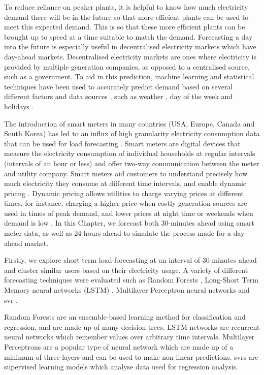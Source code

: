 To reduce reliance on peaker plants, it is helpful to know how much electricity demand there will be in the future so that more efficient plants can be used to meet this expected demand. This is so that these more efficient plants can be brought up to speed at a time suitable to match the demand. Forecasting a day into the future is especially useful in decentralised electricity markets which have day-ahead markets. Decentralised electricity markets are ones where electricity is provided by multiple generation companies, as opposed to a centralised source, such as a government. To aid in this prediction, machine learning and statistical techniques have been used to accurately predict demand based on several different factors and data sources \cite{Kell2018a}, such as weather \cite{Hong2014}, day of the week \cite{Al-Musaylh2018} and holidays \cite{Vrablecova2017}. 


The introduction of smart meters in many countries (USA, Europe, Canada and South Korea) has led to an influx of high granularity electricity consumption data that can be used for load forecasting \cite{Depuru2011a}. Smart meters are digital devices that measure the electricity consumption of individual households at regular intervals (intervals of an hour or less) and offer two-way communication between the meter and utility company. Smart meters aid customers to understand precisely how much electricity they consume at different time intervals, and enable dynamic pricing \cite{Abreu2012a}. Dynamic pricing allows utilities to charge varying prices at different times, for instance, charging a higher price when costly generation sources are used in times of peak demand, and lower prices at night time or weekends when demand is low \cite{Ito2013,Liu2016}. In this Chapter, we forecast both 30-minutes ahead using smart meter data, as well as 24-hours ahead to simulate the process made for a day-ahead market. 



Firstly, we explore short term load-forecasting at an interval of 30 minutes ahead and cluster similar users based on their electricity usage. A variety of different forecasting techniques were evaluated such as Random Forests \cite{ho1995random}, Long-Short Term Memory neural networks (LSTM) \cite{Hochreiter1997}, Multilayer Perceptron neural networks \cite{book:984557} and \acrfull{svr} \cite{Drucker1997}.

Random Forests are an ensemble-based learning method for classification and regression, and are made up of many decision trees. LSTM networks are recurrent neural networks which remember values over arbitrary time intervals. Multilayer Perceptrons are a popular type of neural network which are made up of a minimum of three layers and can be used to make non-linear predictions. \acrshort{svr}s are supervised learning models which analyse data used for regression analysis.

